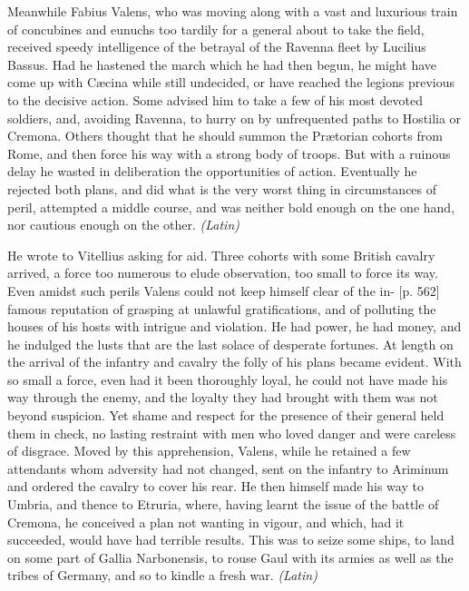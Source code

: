 
Meanwhile Fabius Valens, who was moving along with a vast and luxurious train of concubines and eunuchs too tardily for a general about to take the field, received speedy intelligence of the betrayal of the Ravenna fleet by Lucilius Bassus. Had he hastened the march which he had then begun, he might have come up with Cæcina while still undecided, or have reached the legions previous to the decisive action. Some advised him to take a few of his most devoted soldiers, and, avoiding Ravenna, to hurry on by unfrequented paths to Hostilia or Cremona. Others thought that he should summon the Prætorian cohorts from Rome, and then force his way with a strong body of troops. But with a ruinous delay he wasted in deliberation the opportunities of action. Eventually he rejected both plans, and did what is the very worst thing in circumstances of peril, attempted a middle course, and was neither bold enough on the one hand, nor cautious enough on the other. \emph{(Latin)}


He wrote to Vitellius asking for aid. Three cohorts with some British cavalry arrived, a force too numerous to elude observation, too small to force its way. Even amidst such perils Valens could not keep himself clear of the in- [p. 562] famous reputation of grasping at unlawful gratifications, and of polluting the houses of his hosts with intrigue and violation. He had power, he had money, and he indulged the lusts that are the last solace of desperate fortunes. At length on the arrival of the infantry and cavalry the folly of his plans became evident. With so small a force, even had it been thoroughly loyal, he could not have made his way through the enemy, and the loyalty they had brought with them was not beyond suspicion. Yet shame and respect for the presence of their general held them in check, no lasting restraint with men who loved danger and were careless of disgrace. Moved by this apprehension, Valens, while he retained a few attendants whom adversity had not changed, sent on the infantry to Ariminum and ordered the cavalry to cover his rear. He then himself made his way to Umbria, and thence to Etruria, where, having learnt the issue of the battle of Cremona, he conceived a plan not wanting in vigour, and which, had it succeeded, would have had terrible results. This was to seize some ships, to land on some part of Gallia Narbonensis, to rouse Gaul with its armies as well as the tribes of Germany, and so to kindle a fresh war. \emph{(Latin)}

